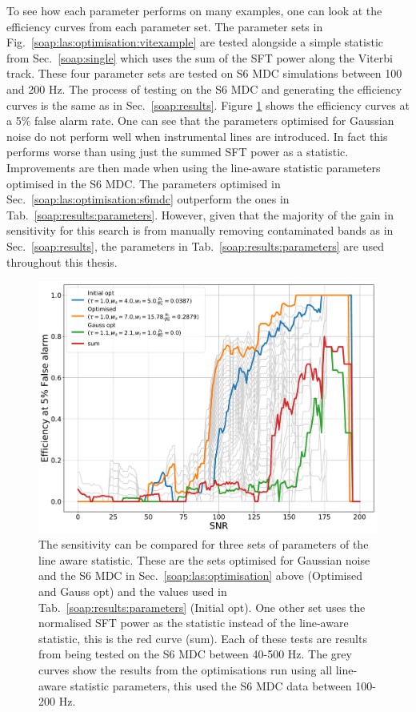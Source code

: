 To see how each parameter performs on many examples, one can look at the efficiency curves from each parameter set. 
The parameter sets in Fig.~\ref{soap:las:optimisation:vitexample} are tested alongside a simple statistic from Sec.~\ref{soap:single} which uses the sum of the \gls{SFT} power along the Viterbi track. 
These four parameter sets are tested on S6 \gls{MDC} simulations between 100 and 200 Hz.
The process of testing on the S6 \gls{MDC} and generating the efficiency curves is the same as in Sec.~\ref{soap:results}.
Figure \ref{soap:las:optimisation:comparison} shows the efficiency curves at a 5\% false alarm rate. 
One can see that the parameters optimised for Gaussian noise do not perform well when instrumental lines are introduced. 
In fact this performs worse than using just the summed \gls{SFT} power as a statistic.
Improvements are then made when using the line-aware statistic parameters optimised in the S6 \gls{MDC}.
The parameters optimised in Sec.~\ref{soap:las:optimisation:s6mdc} outperform the ones in Tab.~\ref{soap:results:parameters}.
However, given that the majority of the gain in sensitivity for this search is from manually removing contaminated bands as in Sec.~\ref{soap:results}, the parameters in Tab.~\ref{soap:results:parameters} are used throughout this thesis.

\begin{figure}[h]
	\centering
	\includegraphics[width=0.9\linewidth]{C3_soap/optimised_comparison.pdf}
	\caption[Comparison of three sets of parameters of the line aware statistic.]{The sensitivity can be compared for three sets of parameters of the line aware statistic. These are the sets optimised for Gaussian noise and the S6 \gls{MDC} in Sec.~\ref{soap:las:optimisation} above (Optimised and Gauss opt) and the values used in Tab.~\ref{soap:results:parameters} (Initial opt). One other set uses the normalised \gls{SFT} power as the statistic instead of the line-aware statistic, this is the red curve (sum). Each of these tests are results from being tested on the S6 \gls{MDC} between 40-500 Hz. The grey curves show the results from the optimisations run using all line-aware statistic parameters, this used the S6 \gls{MDC} data between 100-200 Hz. }
	\label{soap:las:optimisation:comparison}
\end{figure}


